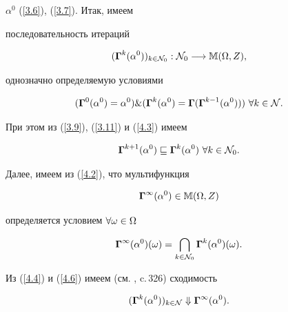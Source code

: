 ${\alpha}^0$ (\ref{3.6}), (\ref{3.7}). Итак, имеем


последовательность итераций


$$


({{\mG}^k}({\alpha}^0))_{k \in


{\cal{N}}_0}:{\cal{N}}_0 \lo \Bbb{M}(\Om,Z),


$$


однозначно определяемую условиями


\begin{equation}\label{4.3}


({{\mG}^0}({\alpha}^0) = {\alpha}^0) \& ({{\mG}^k}({\alpha}^0) =


{\mG}({{\mG}^{k-1}}({\alpha}^0))) \ \fo{k} \in \cal{N}.


\end{equation}


При этом из (\ref{3.9}), (\ref{3.11}) и (\ref{4.3}) имеем


\begin{equation}\label{4.4}


{{\mG}^{k+1}}({\alpha}^0) \sqsubseteq {{\mG}^k}({\alpha}^0) \ \fo{k}


\in {\cal{N}}_0.


\end{equation}


Далее, имеем из (\ref{4.2}), что мультифункция


\begin{equation}\label{4.5}


{{\mG}^\infty}({\alpha}^0) \in \Bbb{M}(\Om,Z)


\end{equation}


определяется условием $\forall{\omega} \in \Omega$


\begin{equation}\label{4.6}


{{\mG}^\infty}({\alpha}^0)(\omega) = \bigcap\limits_{k \in


{\cal{N}}_0}{{\mG}^k}({\alpha}^0)(\omega).


\end{equation}


Из (\ref{4.4}) и (\ref{4.6}) имеем (см. \cite{55}, c.\,326) сходимость


\begin{equation}\label{4.7}


({{\mG}^k}({\alpha}^0))_{k \in \cal{N}} \Dow


{{\mG}^\infty}({\alpha}^0).


\end{equation}



